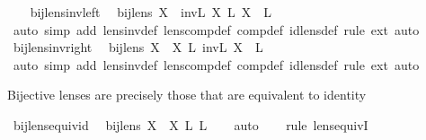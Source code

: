 \begin{isabellebody}
\isanewline
{}\isamarkupfalse%
%
\endisatagproof
{\isafoldproof}%
%
\isadelimproof
\isanewline
%
\endisadelimproof
\ \ \isanewline
{}\isamarkupfalse%
\ bij{\isacharunderscore}lens{\isacharunderscore}inv{\isacharunderscore}left{\isacharcolon}\isanewline
\ \ {\isachardoublequoteopen}bij{\isacharunderscore}lens\ X\ {\isasymLongrightarrow}\ inv\isactrlsub L\ X\ {\isacharsemicolon}\isactrlsub L\ X\ {\isacharequal}\ {}\isactrlsub L{\isachardoublequoteclose}\isanewline
%
\isadelimproof
\ \ %
\endisadelimproof
%
\isatagproof
{}\isamarkupfalse%
\ {\isacharparenleft}auto\ simp\ add{\isacharcolon}\ lens{\isacharunderscore}inv{\isacharunderscore}def\ lens{\isacharunderscore}comp{\isacharunderscore}def\ comp{\isacharunderscore}def\ id{\isacharunderscore}lens{\isacharunderscore}def{\isacharcomma}\ rule\ ext{\isacharcomma}\ auto{\isacharparenright}%
\endisatagproof
{\isafoldproof}%
%
\isadelimproof
\isanewline
%
\endisadelimproof
\isanewline
{}\isamarkupfalse%
\ bij{\isacharunderscore}lens{\isacharunderscore}inv{\isacharunderscore}right{\isacharcolon}\isanewline
\ \ {\isachardoublequoteopen}bij{\isacharunderscore}lens\ X\ {\isasymLongrightarrow}\ X\ {\isacharsemicolon}\isactrlsub L\ inv\isactrlsub L\ X\ {\isacharequal}\ {}\isactrlsub L{\isachardoublequoteclose}\isanewline
%
\isadelimproof
\ \ %
\endisadelimproof
%
\isatagproof
{}\isamarkupfalse%
\ {\isacharparenleft}auto\ simp\ add{\isacharcolon}\ lens{\isacharunderscore}inv{\isacharunderscore}def\ lens{\isacharunderscore}comp{\isacharunderscore}def\ comp{\isacharunderscore}def\ id{\isacharunderscore}lens{\isacharunderscore}def{\isacharcomma}\ rule\ ext{\isacharcomma}\ auto{\isacharparenright}%
\endisatagproof
{\isafoldproof}%
%
\isadelimproof
%
\endisadelimproof
%
\begin{isamarkuptext}%
Bijective lenses are precisely those that are equivalent to identity%
\end{isamarkuptext}\isamarkuptrue%
\isamarkupfalse%
\ bij{\isacharunderscore}lens{\isacharunderscore}equiv{\isacharunderscore}id{\isacharcolon}\isanewline
\ \ {\isachardoublequoteopen}bij{\isacharunderscore}lens\ X\ {\isasymlongleftrightarrow}\ X\ {\isasymapprox}\isactrlsub L\ {}\isactrlsub L{\isachardoublequoteclose}\isanewline
%
\isadelimproof
\ \ %
\endisadelimproof
%
\isatagproof
{}\isamarkupfalse%
\ {\isacharparenleft}auto{\isacharparenright}\isanewline
\ \ \isamarkupfalse%
\ {\isacharparenleft}rule\ lens{\isacharunderscore}equivI{\isacharparenright}\isanewline

\end{isabellebody}
